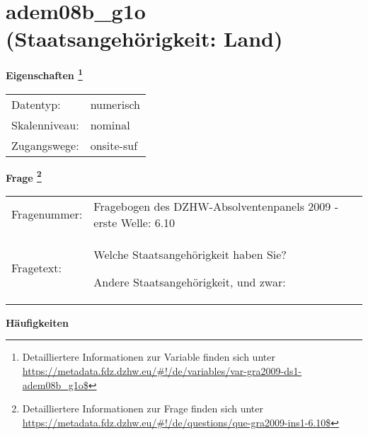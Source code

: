 
    \setcounter{footnote}{0}

    \vspace*{-1.8cm}
	\section{adem08b\_g1o (Staatsangehörigkeit: Land)}
	\label{section:adem08b_g1o}



    \vspace*{0.5cm}
    \noindent\textbf{Eigenschaften
	\footnote{Detailliertere Informationen zur Variable finden sich unter
		\url{https://metadata.fdz.dzhw.eu/\#!/de/variables/var-gra2009-ds1-adem08b_g1o$}}}\\
	\begin{tabularx}{\hsize}{@{}lX}
	Datentyp: & numerisch \\
	Skalenniveau: & nominal \\
	Zugangswege: &
	  onsite-suf
 \\
    \end{tabularx}



				\vspace*{0.5cm}
                \noindent\textbf{Frage
	                \footnote{Detailliertere Informationen zur Frage finden sich unter
		              \url{https://metadata.fdz.dzhw.eu/\#!/de/questions/que-gra2009-ins1-6.10$}}}\\
				\begin{tabularx}{\hsize}{@{}lX}
					Fragenummer: &
					  Fragebogen des DZHW-Absolventenpanels 2009 - erste Welle:
					  6.10
 \\
					Fragetext: & Welche Staatsangehörigkeit haben Sie?\par  Andere Staatsangehörigkeit, und zwar: \\
				\end{tabularx}





        		\vspace*{0.5cm}
                \noindent\textbf{Häufigkeiten}

